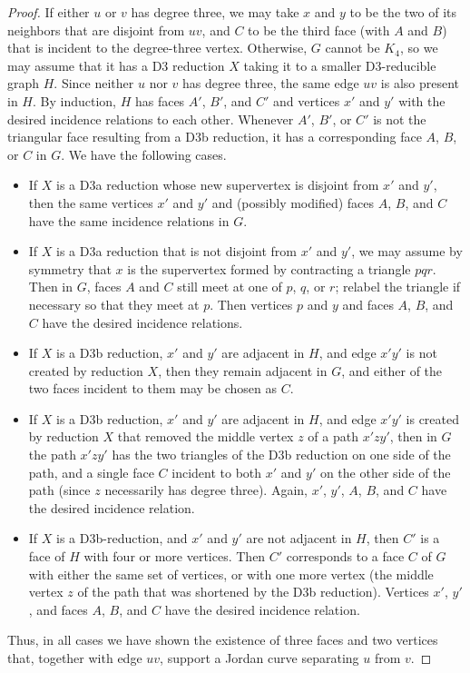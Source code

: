 \documentclass{article}
\begin{document}
\begin{proof}
If either $u$ or $v$ has degree three, we may take $x$ and $y$ to be the two of its neighbors that are disjoint from $uv$, and $C$ to be the third face (with $A$ and $B$) that is incident to the degree-three vertex. Otherwise, $G$ cannot be $K_4$, so we may assume that it has a D3 reduction $X$ taking it to a smaller D3-reducible graph $H$. Since neither $u$ nor $v$ has degree three, the same edge $uv$ is also present in $H$. By induction, $H$ has faces $A'$, $B'$, and $C'$ and vertices $x'$ and $y'$ with the desired incidence relations to each other.
Whenever $A'$, $B'$, or $C'$ is not the triangular face resulting from a D3b reduction, it has a corresponding face $A$, $B$, or $C$ in $G$. We have the following cases.
\begin{itemize}
\item If $X$ is a D3a reduction whose new supervertex is disjoint from $x'$ and $y'$, then the same vertices $x'$ and $y'$ and (possibly modified) faces $A$, $B$, and $C$ have the same incidence relations in $G$.
\item If $X$ is a D3a reduction that is not disjoint from $x'$ and $y'$, we may assume by symmetry that $x$ is the supervertex formed by contracting a triangle $pqr$. Then in $G$, faces $A$ and $C$ still meet at one of $p$, $q$, or $r$; relabel the triangle if necessary so that they meet at $p$.
Then vertices $p$ and $y$ and faces $A$, $B$, and $C$ have the desired incidence relations.
\item If $X$ is a D3b reduction,  $x'$ and $y'$ are adjacent in $H$, and edge $x'y'$ is not created by reduction $X$, then they remain adjacent in $G$, and either of the two faces incident to them may be chosen as $C$.
\item If $X$ is a D3b reduction,  $x'$ and $y'$ are adjacent in $H$, and edge $x'y'$ is created by reduction $X$ that removed the middle vertex $z$ of a path $x'zy'$, then in $G$ the path $x'zy'$ has the two triangles of the D3b reduction on one side of the path, and a single face $C$ incident to both $x'$ and $y'$ on the other side of the path (since $z$ necessarily has degree three). Again, $x'$, $y'$, $A$, $B$, and $C$ have the desired incidence relation.
\item If $X$ is a D3b-reduction, and $x'$ and $y'$ are not adjacent in $H$, then $C'$ is a face of $H$ with four or more vertices. Then $C'$ corresponds to a face $C$ of $G$ with either the same set of vertices, or with one more vertex (the middle vertex $z$ of the path that was shortened by the D3b reduction). Vertices $x'$, $y'$, and faces $A$, $B$, and $C$ have the desired incidence relation.
\end{itemize}
Thus, in all cases we have shown the existence of three faces and two vertices that, together with edge $uv$, support a Jordan curve separating $u$ from $v$.
\end{proof}
\end{document}
